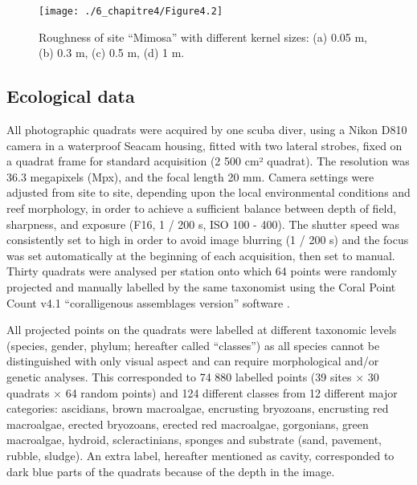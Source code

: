 \begin{figure}[H]
	\begin{center}
	\texttt{[image: ./6\_chapitre4/Figure4.2]}
		\caption[Roughness of site “Mimosa” with different kernel sizes]{Roughness of site “Mimosa” with different kernel sizes: (a) 0.05 m, (b) 0.3 m, (c) 0.5 m, (d) 1 m.}
	\label{figure4.2}
\end{center}
\end{figure}

\newpage

\subsection{Ecological data}\label{chapitre4_2.3}
All photographic quadrats were acquired by one scuba diver, using a Nikon D810 camera in a waterproof Seacam housing, fitted with two lateral strobes, fixed on a quadrat frame for standard acquisition (2 500 cm² quadrat). The resolution was 36.3 megapixels (Mpx), and the focal length 20 mm. Camera settings were adjusted from site to site, depending upon the local environmental conditions and reef morphology, in order to achieve a sufficient balance between depth of field, sharpness, and exposure (F16, 1 / 200 s, ISO 100 - 400). The shutter speed was consistently set to high in order to avoid image blurring (1 / 200 s) and the focus was set automatically at the beginning of each acquisition, then set to manual. Thirty quadrats were analysed per station onto which 64 points were randomly projected and manually labelled by the same taxonomist using the Coral Point Count v4.1 “coralligenous assemblages version” \citep{cpce_coral_2011} software \citep{deter_rapid_2012}.

All projected points on the quadrats were labelled at different taxonomic levels (species, gender, phylum; hereafter called “classes”) as all species cannot be distinguished with only visual aspect and can require morphological and/or genetic analyses. This corresponded to 74 880 labelled points (39 sites $\times$ 30 quadrats $\times$ 64 random points) and 124 different classes from 12 different major categories: ascidians, brown macroalgae, encrusting bryozoans, encrusting red macroalgae, erected bryozoans, erected red macroalgae, gorgonians, green macroalgae, hydroid, scleractinians, sponges and substrate (sand, pavement, rubble, sludge). An extra label, hereafter mentioned as cavity, corresponded to dark blue parts of the quadrats because of the depth in the image. 

